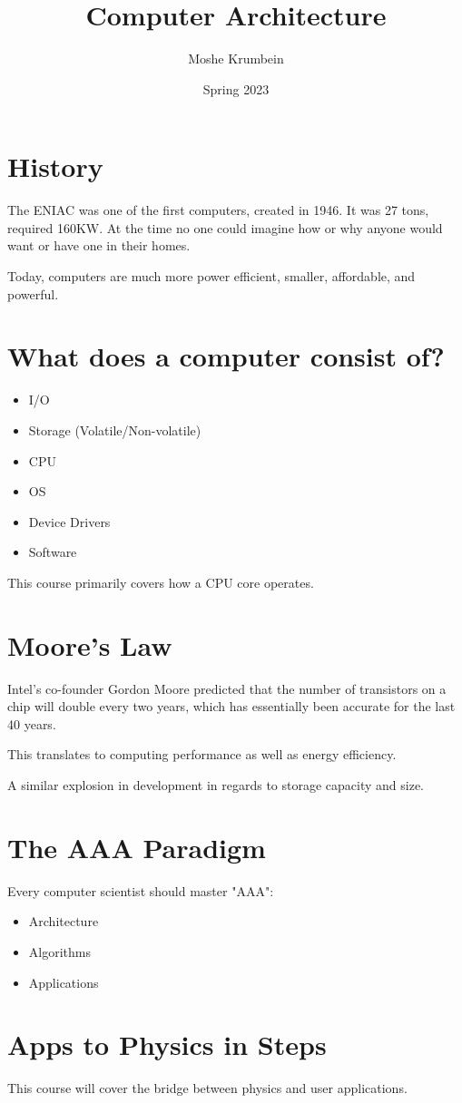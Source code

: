 \documentclass[00_complete]{subfiles}
\title{Computer Architecture}
\author{Moshe Krumbein}
\date{Spring 2023}
\begin{document}
\section{History}
The ENIAC was one of the first computers, created in 1946. It was 27 tons,
required 160KW. At the time no one could imagine how or why anyone would want or
have one in their homes.

Today, computers are much more power efficient, smaller, affordable, and powerful.
\section{What does a computer consist of?}
\begin{itemize}
    \item I/O
    \item Storage (Volatile/Non-volatile)
    \item CPU
    \item OS
    \item Device Drivers
    \item Software
\end{itemize}

This course primarily covers how a CPU core operates.
\section{Moore's Law}
Intel's co-founder Gordon Moore predicted that the number of transistors on a
chip will double every two years, which has essentially been accurate for the
last 40 years.

This translates to computing performance as well as energy efficiency.

A similar explosion in development in regards to storage capacity and size.
\section{The AAA Paradigm}
Every computer scientist should master "AAA":
\begin{itemize}
    \item Architecture
    \item Algorithms
    \item Applications
\end{itemize}
\section{Apps to Physics in Steps}
This course will cover the bridge between physics and user applications.
\end{document}
